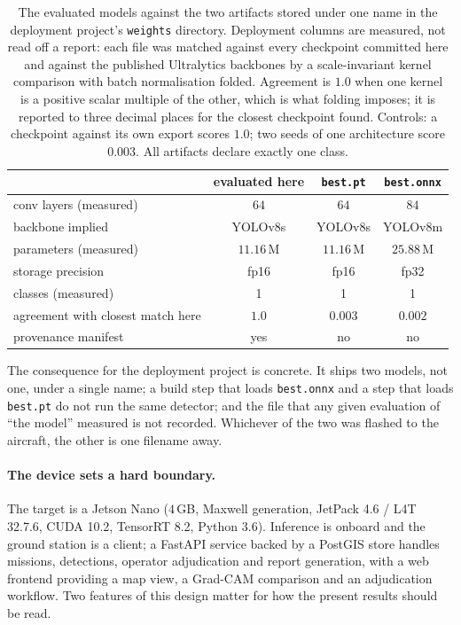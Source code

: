 \begin{table}[t]
\centering
\caption{The evaluated models against the two artifacts stored under one name in
the deployment project's \texttt{weights} directory. Deployment columns are
measured, not read off a report: each file was matched against every checkpoint
committed here and against the published Ultralytics backbones by a
scale-invariant kernel comparison with batch normalisation folded. Agreement is
$1.0$ when one kernel is a positive scalar multiple of the other, which is what
folding imposes; it is reported to three decimal places for the closest
checkpoint found. Controls: a checkpoint against its own export scores $1.0$; two
seeds of one architecture score $0.003$. All artifacts declare exactly one class.}
\label{tab:artifact}
\scriptsize
\setlength{\tabcolsep}{4pt}
\begin{tabular}{lccc}
\toprule
 & evaluated here & \texttt{best.pt} & \texttt{best.onnx} \\
\midrule
conv layers (measured)  & $64$ & $64$ & $84$ \\
backbone implied        & YOLOv8s & YOLOv8s & YOLOv8m \\
parameters (measured)   & $11.16$\,M & $11.16$\,M & $25.88$\,M \\
storage precision       & fp16 & fp16 & fp32 \\
classes (measured)      & 1 & 1 & 1 \\
agreement with closest
  match here             & $1.0$ & $0.003$ & $0.002$ \\
provenance manifest     & yes & no & no \\
\bottomrule
\end{tabular}
\end{table}

The consequence for the deployment project is concrete. It ships two models, not
one, under a single name; a build step that loads \texttt{best.onnx} and a step
that loads \texttt{best.pt} do not run the same detector; and the file that any
given evaluation of ``the model'' measured is not recorded. Whichever of the two
was flashed to the aircraft, the other is one filename away.

\paragraph{The device sets a hard boundary.} The target is a Jetson Nano
($4$\,GB, Maxwell generation, JetPack 4.6 / L4T 32.7.6, CUDA 10.2, TensorRT 8.2,
Python 3.6). Inference is onboard and the ground station is a client; a FastAPI
service backed by a PostGIS store handles missions, detections, operator
adjudication and report generation, with a web frontend providing a map view, a
Grad-CAM comparison and an adjudication workflow. Two features of this design
matter for how the present results should be read.

